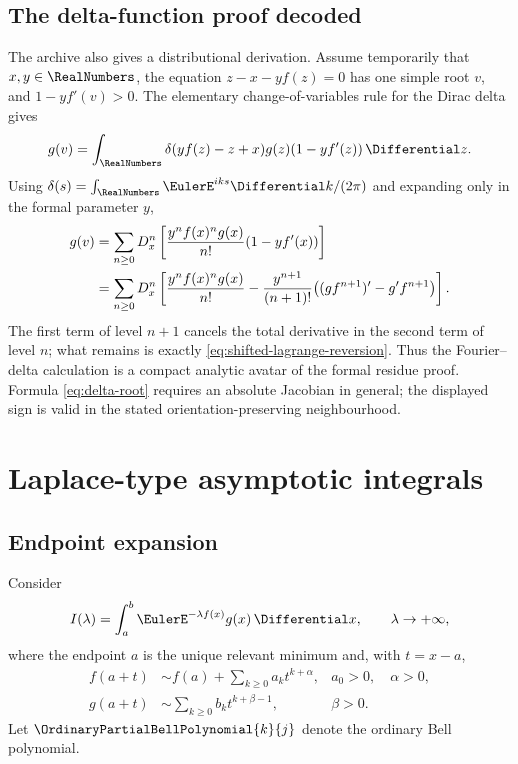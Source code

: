 \documentclass[11pt,a4paper,oneside,openany]{book}
\theoremstyle{definition}
\theoremstyle{remark}
\begin{document}
\section{The delta-function proof decoded}
The archive also gives a distributional derivation.  Assume temporarily that
$x,y\in\RealNumbers$, the equation $z-x-yf(z)=0$ has one simple root $v$, and
$1-yf'(v)>0$.  The elementary change-of-variables rule for the Dirac delta gives
\begin{equation}\label{eq:delta-root}
 g(v)=\int_{\RealNumbers}\delta(yf(z)-z+x)g(z)(1-yf'(z))\,\Differential z.
\end{equation}
Using
$\delta(s)=\int_{\RealNumbers}\EulerE^{iks}\Differential k/(2\pi)$ and expanding only in the formal
parameter $y$,
\begin{align}
 g(v)
 &=\sum_{n\ge0}D_x^n\left[
 \frac{y^nf(x)^ng(x)}{n!}(1-yf'(x))\right]\notag\\
 &=\sum_{n\ge0}D_x^n\left[
 \frac{y^nf(x)^ng(x)}{n!}
 -\frac{y^{n+1}}{(n+1)!}\bigl((gf^{n+1})'-g'f^{n+1}\bigr)
 \right].
 \label{eq:delta-reversion-middle}
\end{align}
The first term of level $n+1$ cancels the total derivative in the second term of
level $n$; what remains is exactly
\eqref{eq:shifted-lagrange-reversion}.  Thus the Fourier--delta calculation is a
compact analytic avatar of the formal residue proof.  Formula
\eqref{eq:delta-root} requires an absolute Jacobian in general; the displayed sign
is valid in the stated orientation-preserving neighbourhood.

\chapter{Laplace-type asymptotic integrals}

\section{Endpoint expansion}
Consider
\begin{equation}\label{eq:laplace-integral}
 I(\lambda)=\int_a^b \EulerE^{-\lambda f(x)}g(x)\,\Differential x,
 \qquad \lambda\to+\infty,
\end{equation}
where the endpoint $a$ is the unique relevant minimum and, with $t=x-a$,
\begin{align}
 f(a+t)&\sim f(a)+\sum_{k\ge0}a_kt^{k+\alpha},
 &a_0>0,\quad\alpha>0,
 \label{eq:laplace-f-expansion}\\
 g(a+t)&\sim\sum_{k\ge0}b_kt^{k+\beta-1},
 &\beta>0.
 \label{eq:laplace-g-expansion}
\end{align}
Let $\OrdinaryPartialBellPolynomial{k}{j}$ denote the ordinary Bell polynomial.
\end{document}
